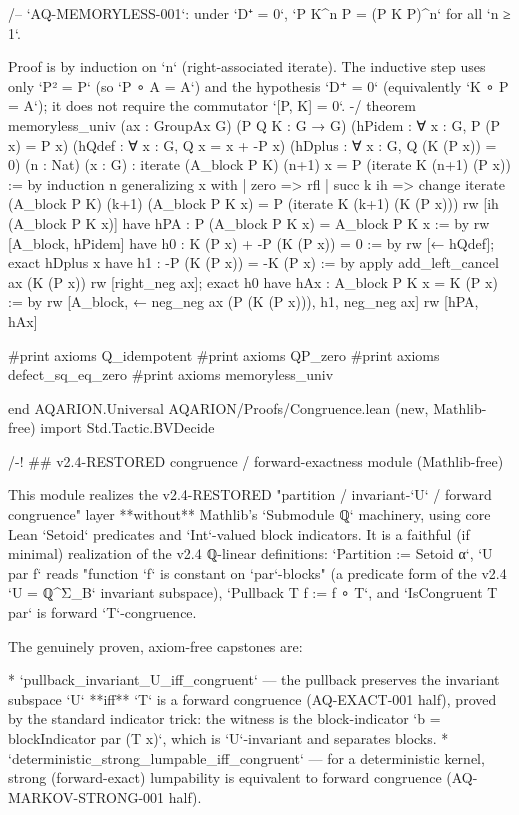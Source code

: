 /-- `AQ-MEMORYLESS-001`: under `D⁺ = 0`, `P K^n P = (P K P)^n` for all `n ≥ 1`.

Proof is by induction on `n` (right-associated iterate). The inductive step
uses only `P² = P` (so `P ∘ A = A`) and the hypothesis `D⁺ = 0` (equivalently
`K ∘ P = A`); it does not require the commutator `[P, K] = 0`. -/
theorem memoryless_univ (ax : GroupAx G) (P Q K : G → G)
    (hPidem : ∀ x : G, P (P x) = P x)
    (hQdef : ∀ x : G, Q x = x + -P x)
    (hDplus : ∀ x : G, Q (K (P x)) = 0)
    (n : Nat) (x : G) :
    iterate (A_block P K) (n+1) x = P (iterate K (n+1) (P x)) := by
  induction n generalizing x with
  | zero => rfl
  | succ k ih =>
    change iterate (A_block P K) (k+1) (A_block P K x)
      = P (iterate K (k+1) (K (P x)))
    rw [ih (A_block P K x)]
    have hPA : P (A_block P K x) = A_block P K x := by
      rw [A_block, hPidem]
    have h0 : K (P x) + -P (K (P x)) = 0 := by rw [← hQdef]; exact hDplus x
    have h1 : -P (K (P x)) = -K (P x) := by
      apply add_left_cancel ax (K (P x))
      rw [right_neg ax]; exact h0
    have hAx : A_block P K x = K (P x) := by
      rw [A_block, ← neg_neg ax (P (K (P x))), h1, neg_neg ax]
    rw [hPA, hAx]

#print axioms Q_idempotent
#print axioms QP_zero
#print axioms defect_sq_eq_zero
#print axioms memoryless_univ

end AQARION.Universal
AQARION/Proofs/Congruence.lean (new, Mathlib-free)
import Std.Tactic.BVDecide

/-! ## v2.4-RESTORED congruence / forward-exactness module (Mathlib-free)

This module realizes the v2.4-RESTORED "partition / invariant-`U` / forward
congruence" layer **without** Mathlib's `Submodule ℚ` machinery, using core Lean
`Setoid` predicates and `Int`-valued block indicators. It is a faithful (if
minimal) realization of the v2.4 ℚ-linear definitions: `Partition := Setoid α`,
`U par f` reads "function `f` is constant on `par`-blocks" (a predicate form of the
v2.4 `U = ℚ^{Σ_B}` invariant subspace), `Pullback T f := f ∘ T`, and
`IsCongruent T par` is forward `T`-congruence.

The genuinely proven, axiom-free capstones are:

* `pullback_invariant_U_iff_congruent` — the pullback preserves the invariant
  subspace `U` **iff** `T` is a forward congruence (AQ-EXACT-001 half), proved by
  the standard indicator trick: the witness is the block-indicator
  `b = blockIndicator par (T x)`, which is `U`-invariant and separates blocks.
* `deterministic_strong_lumpable_iff_congruent` — for a deterministic kernel,
  strong (forward-exact) lumpability is equivalent to forward congruence
  (AQ-MARKOV-STRONG-001 half).

